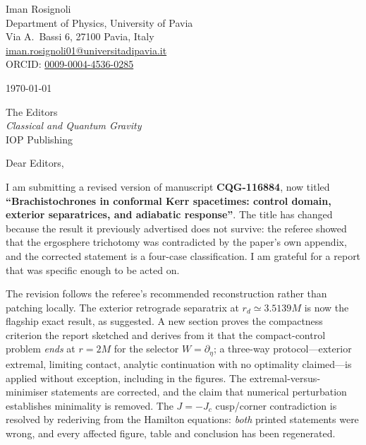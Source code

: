 \documentclass[11pt]{article}
\begin{document}
\thispagestyle{empty}

\noindent
Iman Rosignoli\\
Department of Physics, University of Pavia\\
Via A.\ Bassi 6, 27100 Pavia, Italy\\
\href{mailto:iman.rosignoli01@universitadipavia.it}{iman.rosignoli01@universitadipavia.it}\\
ORCID: \href{https://orcid.org/0009-0004-4536-0285}{0009-0004-4536-0285}

\vspace{0.6em}
\noindent\today

\vspace{0.6em}
\noindent
The Editors\\
\emph{Classical and Quantum Gravity}\\
IOP Publishing

\vspace{0.6em}
\noindent Dear Editors,

\vspace{0.5em}
I am submitting a revised version of manuscript \textbf{CQG-116884}, now titled
\textbf{``Brachistochrones in conformal Kerr spacetimes: control domain, exterior
separatrices, and adiabatic response''}. The title has changed because the result it
previously advertised does not survive: the referee showed that the ergosphere
trichotomy was contradicted by the paper's own appendix, and the corrected statement is a
four-case classification. I am grateful for a report that was specific enough to be
acted on.

The revision follows the referee's recommended reconstruction rather than patching
locally. The exterior retrograde separatrix at $r_d\simeq3.5139M$ is now the flagship
exact result, as suggested. A new section proves the compactness criterion the report
sketched and derives from it that the compact-control problem \emph{ends} at $r=2M$
for the selector $W=\partial_\eta$; a three-way protocol---exterior extremal, limiting
contact, analytic continuation with no optimality claimed---is applied without
exception, including in the figures. The extremal-versus-minimiser statements are
corrected, and the claim that numerical perturbation establishes minimality is
removed. The $J=-J_c$ cusp/corner contradiction is resolved by rederiving from the
Hamilton equations: \emph{both} printed statements were wrong, and every affected
figure, table and conclusion has been regenerated.
\end{document}
